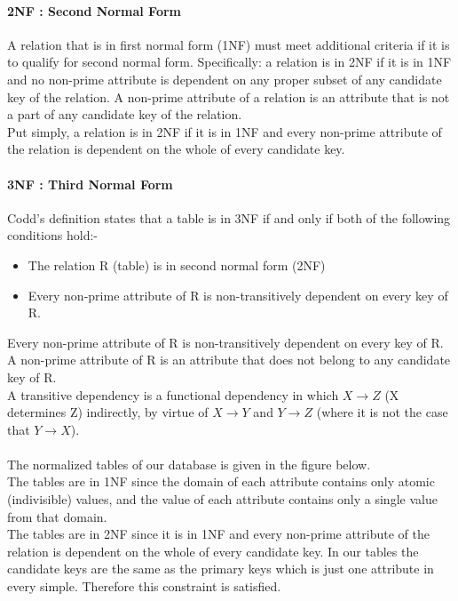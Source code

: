 \documentclass[12pt]{report}
\begin{document}
\paragraph*{2NF : Second Normal Form}
A relation that is in first normal form (1NF) must meet additional criteria if it is to qualify for second normal form. Specifically: a relation is in 2NF if it is in 1NF and no non-prime attribute is dependent on any proper subset of any candidate key of the relation. A non-prime attribute of a relation is an attribute that is not a part of any candidate key of the relation. \\
Put simply, a relation is in 2NF if it is in 1NF and every non-prime attribute of the relation is dependent on the whole of every candidate key.

\paragraph*{3NF : Third Normal Form}
Codd's definition states that a table is in 3NF if and only if both of the following conditions hold:-
\begin{itemize}
\item The relation R (table) is in second normal form (2NF)
\item Every non-prime attribute of R is non-transitively dependent on every key of R.
\end{itemize}

\noindent Every non-prime attribute of R is non-transitively dependent on every key of R.
A non-prime attribute of R is an attribute that does not belong to any candidate key of R.\\
 A transitive dependency is a functional dependency in which 
 $ X \rightarrow Z $ (X determines Z) indirectly, by virtue of $X \rightarrow Y$ and $Y \rightarrow Z$ (where it is not the case that $Y \rightarrow X$). \\\\
 
\noindent The normalized tables of our database is given in the figure below. \\

\noindent The tables are in 1NF since the domain of each attribute contains only atomic (indivisible) values, and the value of each attribute contains only a single value from that domain. \\

\noindent The tables are in 2NF since it is in 1NF and every non-prime attribute of the relation is dependent on the whole of every candidate key. In our tables the candidate keys are the same as the primary keys which is just one attribute in every simple. Therefore this constraint is satisfied. \\
 
\end{document}
